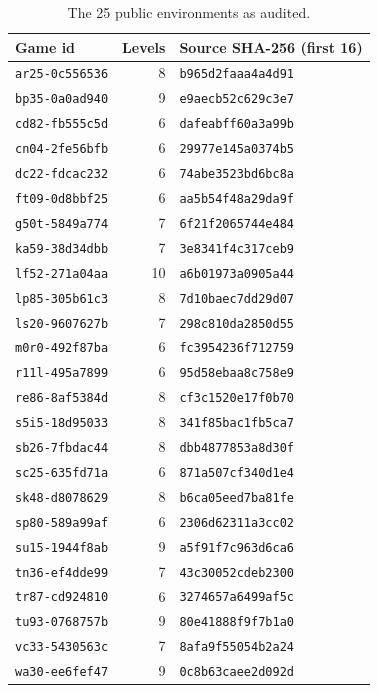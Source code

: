 \documentclass[11pt]{article}
\newcommand{\code}[1]{\texttt{#1}}
\begin{document}
\begin{table}[ht]
\centering\small
\begin{tabular}{lrl}
\toprule
Game id & Levels & Source SHA-256 (first 16) \\
\midrule
\code{ar25-0c556536} & 8 & \code{b965d2faaa4a4d91} \\
\code{bp35-0a0ad940} & 9 & \code{e9aecb52c629c3e7} \\
\code{cd82-fb555c5d} & 6 & \code{dafeabff60a3a99b} \\
\code{cn04-2fe56bfb} & 6 & \code{29977e145a0374b5} \\
\code{dc22-fdcac232} & 6 & \code{74abe3523bd6bc8a} \\
\code{ft09-0d8bbf25} & 6 & \code{aa5b54f48a29da9f} \\
\code{g50t-5849a774} & 7 & \code{6f21f2065744e484} \\
\code{ka59-38d34dbb} & 7 & \code{3e8341f4c317ceb9} \\
\code{lf52-271a04aa} & 10 & \code{a6b01973a0905a44} \\
\code{lp85-305b61c3} & 8 & \code{7d10baec7dd29d07} \\
\code{ls20-9607627b} & 7 & \code{298c810da2850d55} \\
\code{m0r0-492f87ba} & 6 & \code{fc3954236f712759} \\
\code{r11l-495a7899} & 6 & \code{95d58ebaa8c758e9} \\
\code{re86-8af5384d} & 8 & \code{cf3c1520e17f0b70} \\
\code{s5i5-18d95033} & 8 & \code{341f85bac1fb5ca7} \\
\code{sb26-7fbdac44} & 8 & \code{dbb4877853a8d30f} \\
\code{sc25-635fd71a} & 6 & \code{871a507cf340d1e4} \\
\code{sk48-d8078629} & 8 & \code{b6ca05eed7ba81fe} \\
\code{sp80-589a99af} & 6 & \code{2306d62311a3cc02} \\
\code{su15-1944f8ab} & 9 & \code{a5f91f7c963d6ca6} \\
\code{tn36-ef4dde99} & 7 & \code{43c30052cdeb2300} \\
\code{tr87-cd924810} & 6 & \code{3274657a6499af5c} \\
\code{tu93-0768757b} & 9 & \code{80e41888f9f7b1a0} \\
\code{vc33-5430563c} & 7 & \code{8afa9f55054b2a24} \\
\code{wa30-ee6fef47} & 9 & \code{0c8b63caee2d092d} \\
\bottomrule
\end{tabular}
\caption{The 25 public environments as audited.}
\label{tab:envs}
\end{table}
\end{document}
